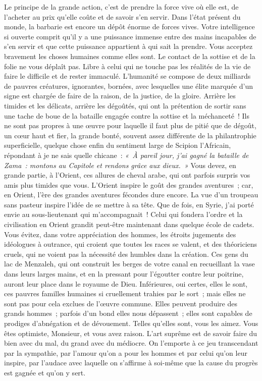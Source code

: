 \documentclass[french,twoside]{book} %
\newcommand\persName[1]{#1}
\newcommand\placeName[1]{#1}
\begin{document}
Le principe de la grande action, c’est de prendre la force vive où elle est, de l’acheter au prix qu’elle coûte et de savoir s’en servir. Dans l’état présent du monde, la barbarie est encore un dépôt énorme de forces vives. Votre intelligence si ouverte comprit qu’il y a une puissance immense entre des mains incapables de s’en servir et que cette puissance appartient à qui sait la prendre. Vous acceptez bravement les choses humaines comme elles sont. Le contact de la sottise et de la folie ne vous déplaît pas. Libre à celui qui ne touche pas les réalités de la vie de faire le difficile et de rester immaculé. L’humanité se compose de deux milliards de pauvres créatures, ignorantes, bornées, avec lesquelles une élite marquée d’un signe est chargée de faire de la raison, de la justice, de la gloire. Arrière les timides et les délicats, arrière les dégoûtés, qui ont la prétention de sortir sans une tache de boue de la bataille engagée contre la sottise et la méchanceté ! Ils ne sont pas propres à une œuvre pour laquelle il faut plus de pitié que de dégoût, un cœur haut et fier, la grande bonté, souvent assez différente de la philantrophie superficielle, quelque chose enfin du sentiment large de {\persName Scipion l’Africain}, répondant à je ne sais quelle chicane : \emph{« À pareil jour, j’ai gagné la bataille de Zama : montons au {\placeName Capitole} et rendons grâce aux dieux. »} Vous devez, en grande partie, à l’{\placeName Orient}, ces allures de cheval arabe, qui ont parfois surpris vos amis plus timides que vous. L’Orient inspire le goût des grandes aventures ; car, en {\placeName Orient}, l’ère des grandes aventures fécondes dure encore. La vue d’un troupeau sans pasteur inspire l’idée de se mettre à sa tête. Que de fois, en {\placeName Syrie}, j’ai porté envie au sous-lieutenant qui m’accompagnait ! Celui qui fondera l’ordre et la civilisation en {\placeName Orient} grandit peut-être maintenant dans quelque école de cadets. Vous évitez, dans votre appréciation des hommes, les étroits jugements des idéologues à outrance, qui croient que toutes les races se valent, et des théoriciens cruels, qui ne voient pas la nécessité des humbles dans la création. Ces gens du {\placeName lac de Menzaleh}, qui ont construit les berges de votre canal en recueillant la vase dans leurs larges mains, et en la pressant pour l’égoutter contre leur poitrine, auront leur place dans le royaume de Dieu. Inférieures, oui certes, elles le sont, ces pauvres familles humaines si cruellement trahies par le sort ; mais elles ne sont pas pour cela exclues de l’œuvre commune. Elles peuvent produire des grands hommes ; parfois d’un bond elles nous dépassent ; elles sont capables de prodiges d’abnégation et de dévouement. Telles qu’elles sont, vous les aimez. Vous êtes optimiste, Monsieur, et vous avez raison. L’art suprême est de savoir faire du bien avec du mal, du grand avec du médiocre. On l’emporte à ce jeu transcendant par la sympathie, par l’amour qu’on a pour les hommes et par celui qu’on leur inspire, par l’audace avec laquelle on s’affirme à soi-même que la cause du progrès est gagnée et qu’on y sert.\par
\end{document}
